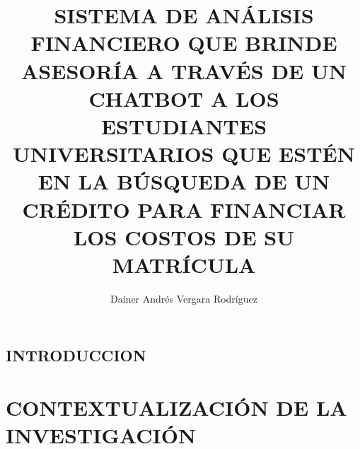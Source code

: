 \documentclass[11pt,letterpaper]{book}
\title{SISTEMA DE ANÁLISIS FINANCIERO QUE BRINDE ASESORÍA A TRAVÉS DE UN CHATBOT A LOS ESTUDIANTES UNIVERSITARIOS QUE ESTÉN EN LA BÚSQUEDA DE UN CRÉDITO PARA FINANCIAR LOS COSTOS DE SU MATRÍCULA}
\author{Dainer Andrés Vergara Rodríguez}
\begin{document}
	
\maketitle
\tableofcontents
\listoffigures
	
\chapter*{INTRODUCCION}

\part{CONTEXTUALIZACIÓN DE LA INVESTIGACIÓN}


	
\end{document}

